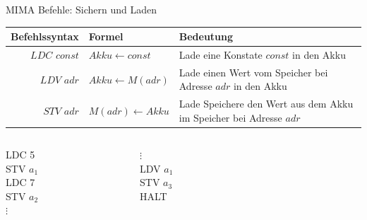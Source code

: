\documentclass[handout]{beamer}
\begin{document}
\begin{frame}{MIMA Befehle: Sichern und Laden}
	\begin{tabular}{r | l p{5cm} }
		Befehlssyntax & Formel & Bedeutung\\\hline\hline 
		$LDC$ $const$ & $Akku \leftarrow const$ & Lade eine Konstate $const$ in den Akku \\\hline 
		$LDV$ $adr$ & $Akku \leftarrow M(adr)$ & Lade einen Wert vom Speicher bei Adresse $adr$ in den Akku\\\hline
		$STV$ $adr$ & $M(adr) \leftarrow Akku$ & Lade Speichere den Wert aus dem Akku im Speicher bei Adresse $adr$\\\hline
	\end{tabular}

	\bp 
	\vspace{.5cm}
	\vspace{.2cm}
	
	\begin{columns}
		\begin{column}{0.25\textwidth}
			LDC 5 \\ STV $a_1$ \\ LDC 7 \\ STV $a_2$ \\ $\vdots$
		\end{column}
		\begin{column}{0.25\textwidth}
			 $\vdots$ \\ LDV $a_1$ \\ STV $a_3$ \\ HALT
		\end{column}
		
		\begin{column}{0.5\textwidth}
			\begin{memory}
			\end{memory}
		\end{column}
	\end{columns}

\end{frame}
\end{document}
